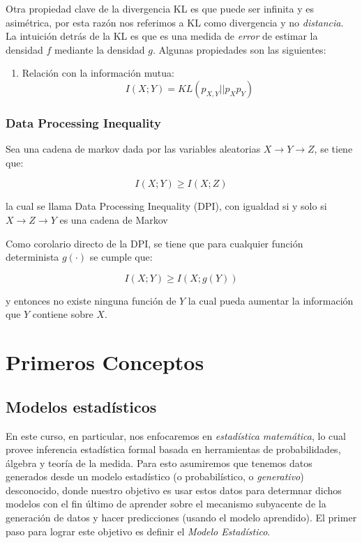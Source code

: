 Otra propiedad clave de la divergencia KL es que puede ser infinita y es asimétrica, por esta razón nos referimos a KL como divergencia y no \emph{distancia}. La intuición detrás de la KL es que es una medida de \textit{error} de estimar la densidad $f$ mediante la densidad $g$. Algunas propiedades son las siguientes:

\begin{prop}
\begin{enumerate}
    \item Relación con la información mutua:
    \[I(X;Y)=KL(p_{X,Y}||p_X p_Y)\]
\end{enumerate}
\end{prop}


\subsection{Data Processing Inequality}

\begin{theorem}
Sea una cadena de markov dada por las variables aleatorias $X\rightarrow Y\rightarrow Z$, se tiene que:

\[I(X;Y)\geq I(X;Z)\]

la cual se llama Data Processing Inequality (DPI), con igualdad si y solo si $X\rightarrow Z\rightarrow Y$ es una cadena de Markov
\end{theorem}

Como corolario directo de la DPI, se tiene que para cualquier función determinista $g(\cdot)$ se cumple que:

\[I(X;Y)\geq I(X;g(Y))\]

y entonces no existe ninguna función de $Y$ la cual pueda aumentar la información que $Y$ contiene sobre $X$.


 









\chapter{Primeros Conceptos}

\section{Modelos estadísticos}

En este curso, en particular, nos enfocaremos en  \emph{estadística matemática}, lo cual provee inferencia estadística formal basada en herramientas de probabilidades, álgebra y teoría de la medida. Para esto asumiremos que tenemos datos generados desde un modelo estadístico (o probabilístico, o \emph{generativo}) desconocido, donde nuestro objetivo es usar estos datos para determnar dichos modelos con el fin 
último de aprender sobre el mecanismo subyacente de la generación de datos y hacer predicciones (usando el modelo aprendido). El primer paso para lograr este objetivo es definir el \emph{Modelo Estadístico}.


